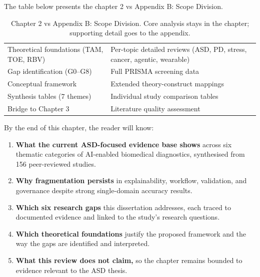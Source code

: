 \noindent The table below presents the chapter 2 vs Appendix B: Scope Division.

\begin{table}[H]
\centering
\caption[Chapter 2 vs Appendix B: Scope Division]{Chapter 2 vs Appendix B: Scope Division. Core analysis stays in the chapter; supporting detail goes to the appendix.}
\tablestripes\tablefontsize
\begin{tabularx}{\textwidth}{@{} L L @{}}
\toprule
{} &  \\
\midrule
Theoretical foundations (TAM, TOE, RBV) & Per-topic detailed reviews (ASD, PD, stress, cancer, agentic, wearable) \\
\addlinespace
Gap identification (G0--G8) & Full PRISMA screening data \\
\addlinespace
Conceptual framework & Extended theory-construct mappings \\
\addlinespace
Synthesis tables (7 themes) & Individual study comparison tables \\
\addlinespace
Bridge to Chapter 3 & Literature quality assessment \\
\bottomrule
\end{tabularx}
\end{table}

\noindent By the end of this chapter, the reader will know:

\begin{enumerate}[label=(\alph*)]
    \item \textbf{What the current ASD-focused evidence base shows} across six thematic categories of AI-enabled biomedical diagnostics, synthesised from 156 peer-reviewed studies.
    \item \textbf{Why fragmentation persists} in explainability, workflow, validation, and governance despite strong single-domain accuracy results.
    \item \textbf{Which six research gaps} this dissertation addresses, each traced to documented evidence and linked to the study's research questions.
    \item \textbf{Which theoretical foundations} justify the proposed framework and the way the gaps are identified and interpreted.
    \item \textbf{What this review does not claim,} so the chapter remains bounded to evidence relevant to the ASD thesis.
\end{enumerate}

